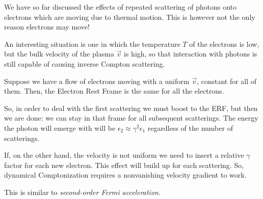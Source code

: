 \documentclass[main.tex]{subfiles}
\begin{document}
We have so far discussed the effects of repeated scattering of photons onto electrons which are moving due to thermal motion. This is however not the only reason electrons may move! 

An interesting situation is one in which the temperature \(T\) of the electrons is low, but the bulk velocity of the plasma \(\vec{v}\) is high, so that interaction with photons is still capable of causing inverse Compton scattering. 

Suppose we have a flow of electrons moving with a uniform \(\vec{v}\), constant for all of them. Then, the Electron Rest Frame is the same for all the electrons. 

So, in order to deal with the first scattering we must boost to the ERF, but then we are done: we can stay in that frame for all subsequent scatterings. 
The energy the photon will emerge with will be \(\epsilon_2 \approx \gamma^2 \epsilon_1 \) regardless of the number of scatterings.

If, on the other hand, the velocity is not uniform we need to insert a relative \(\gamma \) factor for each new electron.
This effect will build up for each scattering. 
So, dynamical Comptonization requires a nonvanishing velocity gradient to work. 


This is similar to \emph{second-order Fermi acceleration.}
\end{document}
